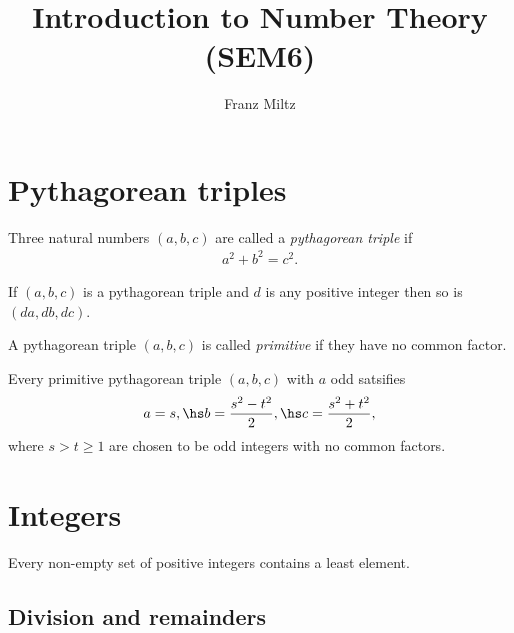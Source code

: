 \documentclass{article}
\begin{document}
\mkthmstwounified
\title{Introduction to Number Theory (SEM6)}
\author{Franz Miltz}
\maketitle
\tableofcontents
\pagebreak

\section{Pythagorean triples}

\begin{definition}
    Three natural numbers $(a,b,c)$ are called a \emph{pythagorean triple} if
    \begin{align*}
        a^2 + b^2 = c^2.
    \end{align*}
\end{definition}

\begin{lemma}
    If $(a,b,c)$ is a pythagorean triple and $d$ is any positive integer then
    so is $(da,db,dc)$.
\end{lemma}

\begin{definition}
    A pythagorean triple $(a,b,c)$ is called \emph{primitive} if they have no common factor.
\end{definition}

\begin{theorem}
    Every primitive pythagorean triple $(a,b,c)$ with $a$ odd satsifies
    \begin{align*}
        a=s,\hs b=\frac{s^2-t^2}{2},\hs c=\frac{s^2+t^2}{2},
    \end{align*}
    where $s>t\geq 1$ are chosen to be odd integers with no common factors.
\end{theorem}

\section{Integers}

\begin{theorem}
    Every non-empty set of positive integers contains a least element.
\end{theorem}

\subsection{Division and remainders}
\end{document}
